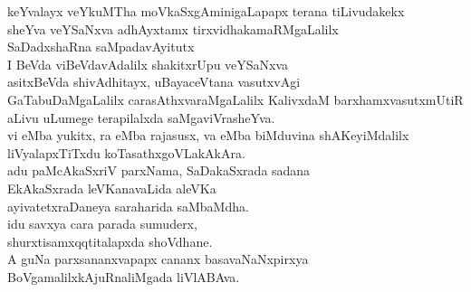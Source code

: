 \begin{entry}
\begin{shl}
keYvalayx veYkuMTha moVkaSxgAminigaLapapx terana tiLivudakekx\\
sheYva veYSaNxva adhAyxtamx tirxvidhakamaRMgaLalilx\\
SaDadxshaRna saMpadavAyitutx\\
I BeVda viBeVdavAdalilx shakitxrUpu veYSaNxva\\
asitxBeVda shivAdhitayx, uBayaceVtana vasutxvAgi\\
GaTabuDaMgaLalilx carasAthxvaraMgaLalilx KalivxdaM barxhamxvasutxmUtiR\\
aLivu uLumege terapilalxda saMgaviVrasheYva.\\
vi eMba yukitx, ra eMba rajasusx, va eMba biMduvina shAKeyiMdalilx\\
liVyalapxTiTxdu koTasathxgoVLakAkAra.\\
adu paMcAkaSxriV parxNama, SaDakaSxrada sadana\\
EkAkaSxrada leVKanavaLida aleVKa\\
ayivatetxraDaneya saraharida saMbaMdha.\\
idu savxya cara parada sumuderx,\\
shurxtisamxqqtitalapxda shoVdhane.\\
A guNa parxsananxvapapx cananx basavaNaNxpirxya\\
BoVgamalilxkAjuRnaliMgada liVlABAva.
\end{shl}
\end{entry}

\begin{entry}
\end{entry}

